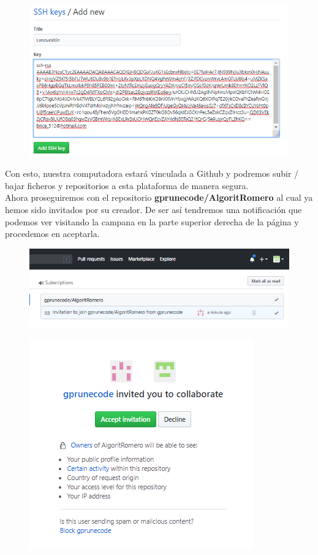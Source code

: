 \documentclass{article}
\begin{document}
\begin{figure}[h!]
  \centering
  \includegraphics[scale=0.75]{./imagenes/Gitbash12.png}
\end{figure}

Con esto, nuestra computadora estará vinculada a Github y podremos subir /
bajar ficheros y repositorios a esta plataforma de manera segura.\\

Ahora proseguiremos con el repositorio \textbf{gprunecode/AlgoritRomero} al
cual ya hemos sido invitados por su creador. De ser así tendremos una
notificación que podemos ver visitando la campana en la parte superior derecha
de la página y procedemos en aceptarla.
\clearpage

\begin{figure}[h!]
  \centering
  \includegraphics[scale=0.75]{./imagenes/GitHub.png}
\end{figure}

\begin{figure}[h!]
  \centering
  \includegraphics[scale=0.75]{./imagenes/GitHub2.png}
\end{figure}
\end{document}
